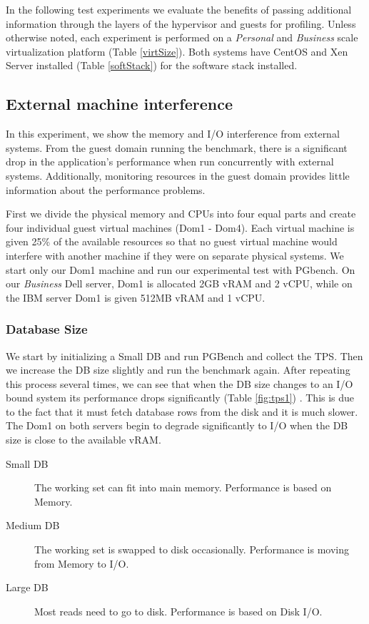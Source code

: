 In the following test experiments we evaluate the benefits of passing additional information through the layers of the hypervisor and guests for profiling.  Unless otherwise noted, each experiment is performed on a \emph{Personal} and \emph{Business} scale virtualization platform (Table \ref{virtSize}).  Both systems have CentOS and Xen Server installed (Table \ref{softStack}) for the software stack installed.

\subsection{External machine interference}
In this experiment, we show the memory and I/O interference from external systems.  From the guest domain running the benchmark, there is a significant drop in the application's performance when run concurrently with external systems.  Additionally, monitoring resources in the guest domain provides little information about the performance problems. 

First we divide the physical memory and CPUs into four equal parts and create four individual guest virtual machines (Dom1 - Dom4).  Each virtual machine is given 25\% of the available resources so that no guest virtual machine would interfere with another machine if they were on separate physical systems.  We start only our Dom1 machine and run our experimental test with PGbench.  On our \emph{Business} Dell server, Dom1 is allocated 2GB vRAM and 2 vCPU, while on the IBM server Dom1 is given 512MB vRAM and 1 vCPU.  

\subsubsection{Database Size}
We start by initializing a Small DB and run PGBench and collect the TPS.  Then we increase the DB size slightly and run the benchmark again.  After repeating this process several times, we can see that when the DB size changes to an I/O bound system its performance drops significantly (Table \ref{fig:tps1}) .  This is due to the fact that it must fetch database rows from the disk and it is much slower.  The Dom1 on both servers begin to degrade significantly to I/O when the DB size is close to the available vRAM.

\begin{description}
  \item[Small DB] The working set can fit into main memory.  Performance is based on Memory.
  \item[Medium DB] The working set is swapped to disk occasionally. Performance is moving from Memory to I/O.
  \item[Large DB] Most reads need to go to disk.  Performance is based on Disk I/O.
\end{description}


